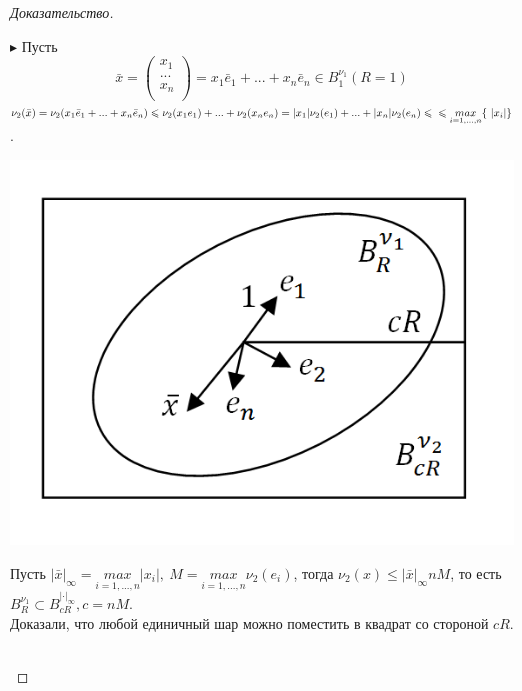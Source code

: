 \documentclass[12pt]{article}
\theoremstyle{definition}
\numberwithin{equation}{section}
\begin{document}
\begin{proof}[Доказательство]
\begin{enumerate}
			$\blacktriangleright$ 
			Пусть \[\bar x = \begin{pmatrix}
			x_1 \\
			...\\
			x_n \\
			\end{pmatrix} = x_1 \bar e_1 +...+x_n \bar e_n \in B_1^{\nu_1} (R = 1)\]
			$\nu_2(\bar x) = \nu_2 (x_1 \bar e_1 +...+x_n \bar e_n) \leqslant \nu_2(x_1e_1)+...+\nu_2(x_ne_n) = |x_1|\nu_2(e_1)+...+|x_n|\nu_2(e_n) \leqslant \\ \leqslant \underset{i=1,...,n}{max} \{\ |x_i|\}$.\begin{center}
				\includegraphics[scale=0.5]{l5_5.png}\end{center}
			Пусть $|\bar x|_{\infty} = \underset{i=1,...,n}{max}|x_i|, ~M = \underset{i=1,...,n}{max}\nu_2(e_i)$, тогда $\nu_2(x) \leqslant |\bar x|_{\infty}nM$, то есть $B_R^{\nu_1} \subset B_{cR}^{|\cdot |_{\infty}}, c = nM$.\\
			Доказали, что любой единичный шар можно поместить в квадрат со стороной $cR$.\\
			\\

\end{enumerate}
\end{proof}
\end{document}
